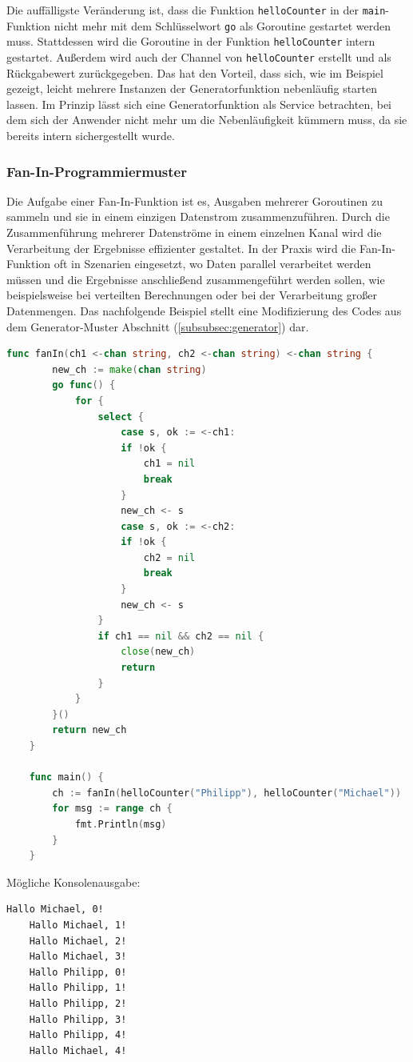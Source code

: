 \documentclass[fontsize=12pt,paper=a4,twoside=semi,parskip=half-,headsepline,headinclude]{scrreprt}
\begin{document}
Die auffälligste Veränderung ist, dass die Funktion \texttt{helloCounter} in der \texttt{main}-Funktion nicht mehr mit dem Schlüsselwort \texttt{go} als Goroutine gestartet werden muss. Stattdessen wird die Goroutine in der Funktion \texttt{helloCounter} intern gestartet. Außerdem wird auch der Channel von \texttt{helloCounter} erstellt und als Rückgabewert zurückgegeben. Das hat den Vorteil, dass sich, wie im Beispiel gezeigt, leicht mehrere Instanzen der Generatorfunktion nebenläufig starten lassen. Im Prinzip lässt sich eine Generatorfunktion als Service betrachten, bei dem sich der Anwender nicht mehr um die Nebenläufigkeit kümmern muss, da sie bereits intern sichergestellt wurde.

\subsubsection{Fan-In-Programmiermuster}

Die Aufgabe einer Fan-In-Funktion ist es, Ausgaben mehrerer Goroutinen zu sammeln und sie in einem einzigen Datenstrom zusammenzuführen. Durch die Zusammenführung mehrerer Datenströme in einem einzelnen Kanal wird die Verarbeitung der Ergebnisse effizienter gestaltet. In der Praxis wird die Fan-In-Funktion oft in Szenarien eingesetzt, wo Daten parallel verarbeitet werden müssen und die Ergebnisse anschließend zusammengeführt werden sollen, wie beispielsweise bei verteilten Berechnungen oder bei der Verarbeitung großer Datenmengen. Das nachfolgende Beispiel stellt eine Modifizierung des Codes aus dem Generator-Muster Abschnitt (\ref{subsubsec:generator}) dar.

\begin{lstlisting}[language=Go,extendedchars=true]
	func fanIn(ch1 <-chan string, ch2 <-chan string) <-chan string {
		new_ch := make(chan string)
		go func() {
			for {
				select {
					case s, ok := <-ch1:
					if !ok {
						ch1 = nil
						break
					}
					new_ch <- s
					case s, ok := <-ch2:
					if !ok {
						ch2 = nil
						break
					}
					new_ch <- s
				}
				if ch1 == nil && ch2 == nil {
					close(new_ch)
					return
				}
			}
		}()
		return new_ch
	}

	func main() {
		ch := fanIn(helloCounter("Philipp"), helloCounter("Michael"))
		for msg := range ch {
			fmt.Println(msg)
		}
	}
\end{lstlisting}
Mögliche Konsolenausgabe:
\begin{lstlisting}[frame=shadowbox, rulecolor=\color{black}, backgroundcolor=\color{gray!10}]
	Hallo Michael, 0!
	Hallo Michael, 1!
	Hallo Michael, 2!
	Hallo Michael, 3!
	Hallo Philipp, 0!
	Hallo Philipp, 1!
	Hallo Philipp, 2!
	Hallo Philipp, 3!
	Hallo Philipp, 4!
	Hallo Michael, 4!
\end{lstlisting}
\end{document}
